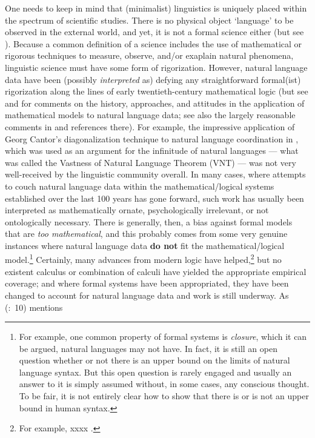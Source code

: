 \documentclass[11pt]{article}
\newcommand{\pgcitet}[2]{\citeauthor{#1} (\citeyear{#1}:~#2)}
\begin{document}
One needs to keep in mind that (minimalist) linguistics is uniquely placed within the spectrum of scientific studies. There is no physical object `language' to be observed in the external world, and yet, it is not a formal science either (but see \citealt{katz:1998}). Because a common definition of a science includes the use of mathematical or rigorous techniques to measure, observe, and/or exaplain natural phenomena, linguistic science must have some form of rigorization. However, natural language data have been (possibly \textsl{interpreted} as) defying any straightforward formal(ist) rigorization along the lines of early twentieth-century mathematical logic (but see \citealt{pullumscholz03contrasting, pullumscholz09recursion} and \citealt{scholzpullum07origins} for comments on the history, approaches, and attitudes in the application of mathematical models to natural language data; see also the largely reasonable comments in \citealt{postal09incoherence} and references there). For example, the impressive application of Georg Cantor's diagonalization technique to natural language coordination in \cite{langpostal:1984}, which was used as an argument for the infinitude of natural languages --- what was called the Vastness of Natural Language Theorem (VNT) --- was not very well-received by the linguistic community overall. In many cases, where attempts to couch natural language data within the mathematical/logical systems established over the last 100 years has gone forward, such work has usually been interpreted as mathematically ornate, psychologically irrelevant, or not ontologically necessary. There is generally, then, a bias against formal models that are \textsl{too mathematical}, and this probably comes from some very genuine instances where natural language data \textbf{do not} fit the mathematical/logical model.\footnote{For example, one common property of formal systems is \textsl{closure}, which it can be argued, natural languages may not have. In fact, it is still an open question whether or not there is an upper bound on the limits of natural language syntax. But this open question is rarely engaged and usually an answer to it is simply assumed without, in some cases, any conscious thought. To be fair, it is not entirely clear how to show that there is or is not an upper bound in human syntax.} Certainly, many advances from modern logic have helped,\footnote{For example, xxxx .} but no existent calculus or combination of calculi have yielded the appropriate empirical coverage; and where formal systems have been appropriated, they have been changed to account for natural language data and work is still underway. As \pgcitet{partee08symmetry}{10} mentions
\end{document}
